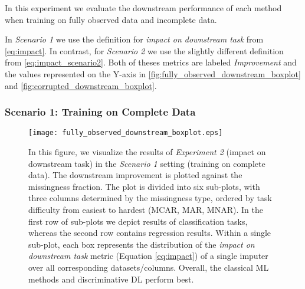 In this experiment we evaluate the downstream performance of each method when training on fully observed data and incomplete data.

In \textit{Scenario 1} we use the definition for \textit{impact on downstream task} from \autoref{eq:impact}. In contrast, for \textit{Scenario 2} we use the slightly different definition from \autoref{eq:impact_scenario2}. Both of theses metrics are labeled \textit{Improvement} and the values represented on the Y-axis in \autoref{fig:fully_observed_downstream_boxplot} and \autoref{fig:corrupted_downstream_boxplot}.




\subsubsection{Scenario 1: Training on Complete Data}



\begin{figure}\centering
	\texttt{[image: fully\_observed\_downstream\_boxplot.eps]}

	\caption[Downstream Ranks - Fully Observed]{In this figure, we visualize the results of \textit{Experiment 2} (impact on downstream task) in the \textit{Scenario 1} setting (training on complete data). The downstream improvement is plotted against the missingness fraction. The plot is divided into six sub-plots, with three columns determined by the missingness type, ordered by task difficulty from easiest to hardest (MCAR, MAR, MNAR). In the first row of sub-plots we depict results of classification tasks, whereas the second row contains regression results. Within a single sub-plot, each box represents the distribution of the \textit{impact on downstream task} metric (Equation \ref{eq:impact}) of a single imputer over all corresponding datasets/columns. Overall, the classical ML methods and discriminative DL perform best.
    }
	\label{fig:fully_observed_downstream_boxplot}
\end{figure}

